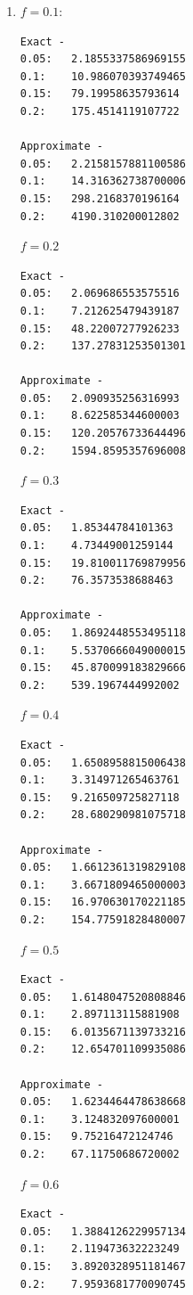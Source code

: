 \documentclass[]{exam}
\begin{document}
\begin{questions}
\begin{enumerate}[label=\arabic*.]
		\begin{verbatim}
0.05:	2.2147609258487027
0.1:	13.284931849129581
0.15:	91.25316599696535
0.2:	187.01853110400157
		\end{verbatim}
		Computing the approximations, we have:
		\begin{verbatim}
0.05:	2.245887055423145
0.1:	17.525090005300004
0.15:	414.43051462288486
0.2:	5935.081178726405
		\end{verbatim}
	\item $f = 0.1:$
		\begin{verbatim}
Exact -
0.05:	2.1855337586969155
0.1:	10.986070393749465
0.15:	79.19958635793614
0.2:	175.4514119107722

Approximate -
0.05:	2.2158157881100586
0.1:	14.316362738700006
0.15:	298.2168370196164
0.2:	4190.310200012802
		\end{verbatim}
		$f = 0.2$
		\begin{verbatim}
Exact -
0.05:	2.069686553575516
0.1:	7.212625479439187
0.15:	48.22007277926233
0.2:	137.27831253501301

Approximate -
0.05:	2.090935256316993
0.1:	8.622585344600003
0.15:	120.20576733644496
0.2:	1594.8595357696008
		\end{verbatim}
		$f = 0.3$
		\begin{verbatim}
Exact -
0.05:	1.85344784101363
0.1:	4.73449001259144
0.15:	19.810011769879956
0.2:	76.3573538688463

Approximate -
0.05:	1.8692448553495118
0.1:	5.5370666049000015
0.15:	45.870099183829666
0.2:	539.1967444992002
		\end{verbatim}
		$f = 0.4$
		\begin{verbatim}
Exact -
0.05:	1.6508958815006438
0.1:	3.314971265463761
0.15:	9.216509725827118
0.2:	28.680290981075718

Approximate -
0.05:	1.6612361319829108
0.1:	3.6671809465000003
0.15:	16.970630170221185
0.2:	154.77591828480007
		\end{verbatim}
		$f = 0.5$
		\begin{verbatim}
Exact -
0.05:	1.6148047520808846
0.1:	2.897113115881908
0.15:	6.0135671139733216
0.2:	12.654701109935086

Approximate -
0.05:	1.6234464478638668
0.1:	3.124832097600001
0.15:	9.75216472124746
0.2:	67.11750686720002
		\end{verbatim}
		$f = 0.6$
		\begin{verbatim}
Exact -
0.05:	1.3884126229957134
0.1:	2.119473632223249
0.15:	3.8920328951181467
0.2:	7.9593681770090745


\end{verbatim}
\end{enumerate}
\end{questions}
\end{document}
